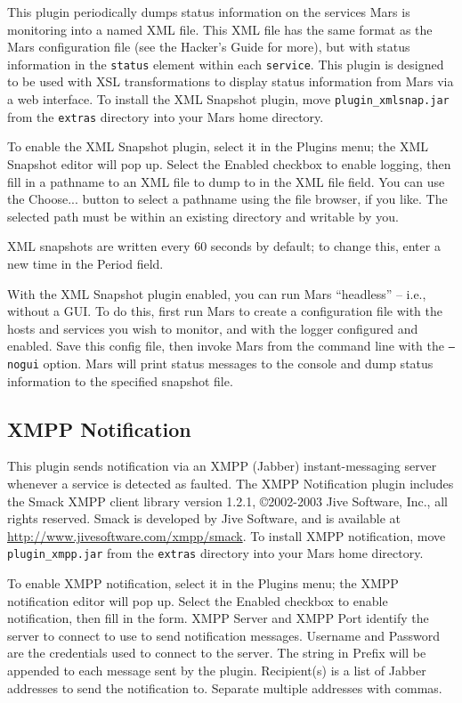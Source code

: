 \documentclass{article}
\newcommand{\filename}[1]{{\tt #1}}
\newcommand{\cmdline}[1]{{\tt #1}}
\newcommand{\identifier}[1]{{\tt #1}}
\newcommand{\guiitem}[1]{{\sf #1}}
\begin{document}
This plugin periodically dumps status information on the services Mars
is monitoring into a named XML file. This XML file has the same format
as the Mars configuration file (see the Hacker's Guide for more), but
with status information in the \identifier{status} element within each
\identifier{service}. This plugin is designed to be used with XSL
transformations to display status information from Mars via a web
interface. To install the XML Snapshot plugin, move
\filename{plugin\_xmlsnap.jar} from the \filename{extras} directory
into your Mars home directory.

To enable the XML Snapshot plugin, select it in the \guiitem{Plugins}
menu; the XML Snapshot editor will pop up. Select the
\guiitem{Enabled} checkbox to enable logging, then fill in a pathname
to an XML file to dump to in the \guiitem{XML file} field. You can use
the \guiitem{Choose...}  button to select a pathname using the file
browser, if you like. The selected path must be within an
existing directory and writable by you.

XML snapshots are written every 60 seconds by default; to change this,
enter a new time in the \guiitem{Period} field.

With the XML Snapshot plugin enabled, you can run Mars ``headless'' --
i.e., without a GUI. To do this, first run Mars to create a
configuration file with the hosts and services you wish to monitor,
and with the logger configured and enabled. Save this config file,
then invoke Mars from the command line with the \cmdline{--nogui}
option. Mars will print status messages to the console and dump status
information to the specified snapshot file.

\subsection{XMPP Notification}

This plugin sends notification via an XMPP (Jabber) instant-messaging
server whenever a service is detected as faulted.  The XMPP
Notification plugin includes the Smack XMPP client library version
1.2.1, \copyright 2002-2003 Jive Software, Inc., all rights
reserved. Smack is developed by Jive Software, and is available at
\url{http://www.jivesoftware.com/xmpp/smack}. To install XMPP
notification, move \filename{plugin\_xmpp.jar} from the
\filename{extras} directory into your Mars home directory.

To enable XMPP notification, select it in the \guiitem{Plugins} menu;
the XMPP notification editor will pop up. Select the \guiitem{Enabled}
checkbox to enable notification, then fill in the form. \guiitem{XMPP
  Server} and \guiitem{XMPP Port} identify the server to connect to
use to send notification messages.  \guiitem{Username} and
\guiitem{Password} are the credentials used to connect to the
server. The string in \guiitem{Prefix} will be appended to each
message sent by the plugin. \guiitem{Recipient(s)} is a list of Jabber
addresses to send the notification to. Separate multiple addresses
with commas.
\end{document}
